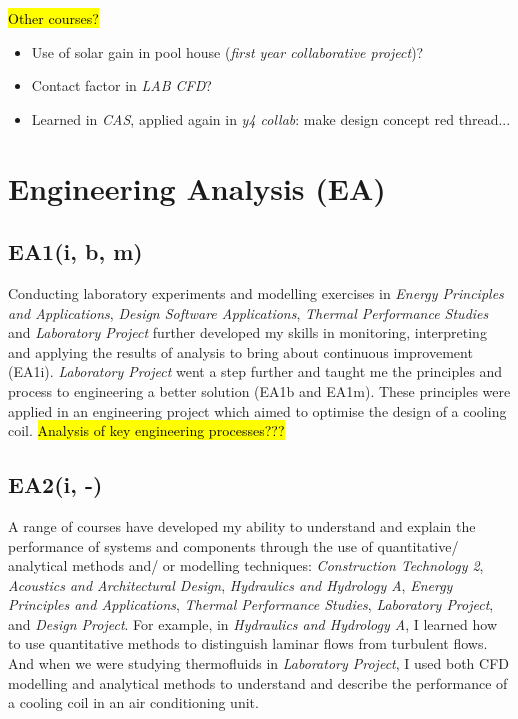 \hl{Other courses?}
\begin{itemize}
	\item Use of solar gain in pool house (\textit{first year collaborative project})?
	\item Contact factor in \textit{LAB CFD}?
	\item Learned in \textit{CAS}, applied again in \textit{y4 collab}: make design concept red thread...
\end{itemize}



\section{Engineering Analysis (EA)} \label{EA}

\subsection*{EA1(i, b, m)}

Conducting laboratory experiments and modelling exercises in \textit{Energy Principles and Applications}, \textit{Design Software Applications}, \textit{Thermal Performance Studies} and \textit{Laboratory Project} further developed my skills in monitoring, interpreting and applying the results of analysis to bring about continuous improvement (EA1i).
\textit{Laboratory Project} went a step further and taught me the principles and process to engineering a better solution (EA1b and EA1m).
These principles were applied in an engineering project which aimed to optimise the design of a cooling coil.
\hl{Analysis of key engineering processes???}


\subsection*{EA2(i, -)}

A range of courses have developed my ability to understand and explain the performance of systems and components through the use of quantitative/ analytical methods and/ or modelling techniques:
\textit{Construction Technology 2},
\textit{Acoustics and Architectural Design},
\textit{Hydraulics and Hydrology A},
\textit{Energy Principles and Applications},
\textit{Thermal Performance Studies},
\textit{Laboratory Project},
and \textit{Design Project}.
For example, in \textit{Hydraulics and Hydrology A}, I learned how to use quantitative methods to distinguish laminar flows from turbulent flows.
And when we were studying thermofluids in \textit{Laboratory Project}, I used both CFD modelling and analytical methods to understand and describe the performance of a cooling coil in an air conditioning unit.

